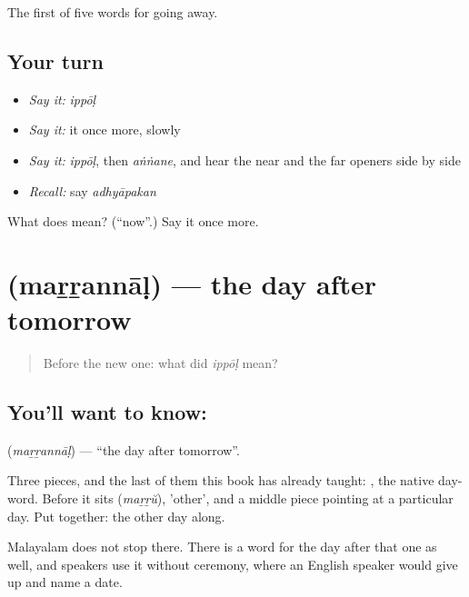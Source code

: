 \begin{grammarlens}[title={What you've built}]
The first of five words for going away.
\end{grammarlens}

\subsection*{Your turn}
\begin{itemize}
\raggedright
  \item \emph{Say it:} \emph{ippōḷ}
  \item \emph{Say it:} it once more, slowly
  \item \emph{Say it:} \emph{ippōḷ}, then \emph{aṅṅane}, and hear the near and the far openers side by side
  \item \emph{Recall:} say \emph{adhyāpakan}
\end{itemize}

\begin{tcolorbox}[breakable,colback=teal!4,colframe=teal!35!black,title={Before you move on}]
What does  mean? (\textquotedblleft{}now\textquotedblright{}.) Say it once more.
\end{tcolorbox}
\section[\texorpdfstring{\ml{മറ്റന്നാൾ} (maṟṟannāḷ)}{മറ്റന്നാൾ (maṟṟannāḷ)}]{ (maṟṟannāḷ) — the day after tomorrow}

\label{lesson:ML-C50-day-after}



\begin{quote}
Before the new one: what did \emph{ippōḷ} mean?
\end{quote}

\subsection*{You'll want to know: }
\textbf{} (\emph{maṟṟannāḷ}) — \textquotedblleft{}the day after tomorrow\textquotedblright{}.

Three pieces, and the last of them this book has already taught: , the native day-word. Before it sits  (\emph{maṟṟŭ}), 'other', and a middle piece pointing at a particular day. Put together: the other day along.

Malayalam does not stop there. There is a word for the day after that one as well, and speakers use it without ceremony, where an English speaker would give up and name a date.

